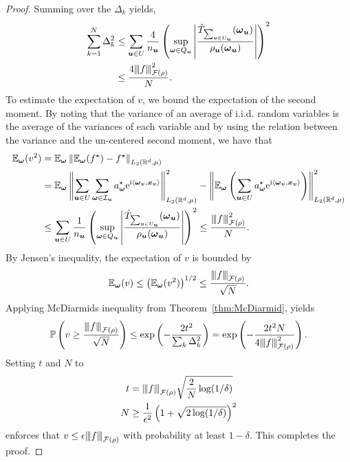 \documentclass{article}
\renewcommand{\vec}[1]{\ensuremath \mathbf{\boldsymbol{#1}}}
\newcommand{\w}{\ensuremath{\vec \omega}}
\newcommand{\x}{\ensuremath{\vec x}}
\newcommand{\normm}[1]{{\left\vert\kern-0.25ex\left\vert\kern-0.25ex\left\vert #1 
    \right\vert\kern-0.25ex\right\vert\kern-0.25ex\right\vert}}
\newcommand{\F}{\ensuremath{\mathcal{F}}}
\newcommand{\I}{\ensuremath{\mathcal{I}}}
\newcommand{\R}{\ensuremath{\mathbb{R}}}
\newcommand{\E}{\ensuremath{\mathbb{E}}}
\renewcommand{\P}{\ensuremath{\mathbb{P}}}
\newcommand{\e}{\mathrm{e}}
\newcommand{\im}{\mathrm{i}}
\newcommand{\norm}[1]{\left\lVert {#1} \right\rVert}    %
\theoremstyle{definition}
\numberwithin{equation}{section}
\begin{document}
\begin{proof}
Summing over the $\Delta_k$ yields,
\begin{align*}
\sum_{k=1}^N \Delta_k^2 &\leq  \sum_{\vec u\in U}\frac{4}{n_{\vec u}} \left(\sup_{\w \in Q_{\vec u}} \left|\frac{\hat{T}_{\sum_{\vec v\in U_{\vec u}}}(\w_{\vec u})}{\rho_{\vec u}(\w_{\vec u})}\right|\right)^2\\
&\leq  \frac{4\normm{f}^2_{\F(\rho)}}{N} .
\end{align*}
To estimate the expectation of $v$, we bound the expectation of the second moment. By noting that the variance of an average of i.i.d. random variables is the average of the variances of each variable and by using the relation between the variance and the
un-centered second moment, we have that
\begin{align*}
\E_{\w} (v^2) &=\E_{\w}\norm{\E_{\w}(f^\star)-f^\star}_{L_2(\R^d,\mu)}\\
&= \E_{\w}\norm{\sum_{\vec u\in U} \sum_{\w \in \I_{\vec u}}a^\star_{\w}\e^{\im \langle \w_{\vec v},\x_{\vec v}\rangle}}^2_{L_2(\R^d,\mu)} - \norm{\E_{\w}\left(\sum_{\vec u\in U} a^\star_{\w}\e^{\im \langle \w_{\vec v},\x_{\vec v}\rangle}\right)}^2_{L_2(\R^d,\mu)} \\
 &\leq\sum_{\vec u\in U}\frac{1}{n_{\vec u}} \left(\sup_{\w \in Q_{\vec u}}\left| \frac{\hat{T}_{\sum_{\vec v\in U_{\vec u}}}(\w_{\vec u})}{\rho_{\vec u}(\w_{\vec u})}\right|\right)^2\leq
\frac{\normm{f}_{\F(\rho)}^2}{N}.
\end{align*}
By Jensen’s inequality, the expectation of $v$ is bounded by
\begin{align*}
\E_{\w} (v)\leq \left(\E_{\w} (v^2)\right)^{1/2}\leq \frac{\normm{f}_{\F(\rho)}}{\sqrt{N}}.
\end{align*}
Applying McDiarmids inequality from Theorem~\ref{thm:McDiarmid}, yields
$$\P\left(v \geq \frac{\normm{f}_{\F(\rho)}}{\sqrt{N}}\right)\leq \exp\left(-\frac{2t^2}{\sum_{k}\Delta_k^2}\right) =\exp\left(-\frac{2t^2N}{ 4\normm{f}^2_{\F(\rho)} }\right).  $$
Setting $t$ and $N$ to 
\begin{align*}
t &=\normm{f}_{\F(\rho)}\sqrt{\frac 2N \log(1/\delta)}\\
N &\geq \frac{1}{\epsilon^2}\left(1+ \sqrt{2\log(1/\delta)}\right)^2
\end{align*}
enforces that $v\leq \epsilon \normm{f}_{\F(\rho)} $ with probability at least $1-\delta$. This completes the proof.
\end{proof}
\end{document}
